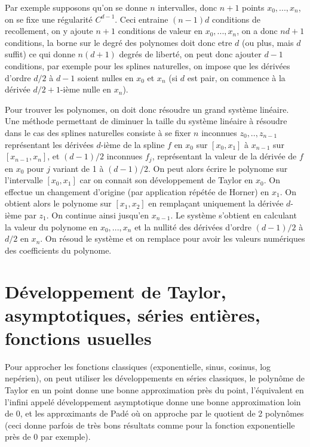 \documentclass[a4paper,11pt]{book}
\begin{document}
\begin{giacjshere}
Par exemple supposons qu'on se donne $n$ intervalles, donc $n+1$
points $x_0,...,x_n$, on se fixe une régularité $C^{d-1}$. Ceci
entraine $(n-1)d$ conditions de recollement, on y ajoute $n+1$
conditions de valeur en $x_0,...,x_n$, on a donc $nd+1$ conditions,
la borne sur le degré des polynomes doit donc etre $d$ (ou plus,
mais $d$ suffit) ce qui donne $n(d+1)$ degrés de liberté, on
peut donc ajouter $d-1$ conditions, par exemple pour les splines
naturelles, on impose que les dérivées d'ordre $d/2$ à $d-1$
soient nulles en $x_0$ et $x_n$ (si $d$ est pair, on commence à
la dérivée $d/2+1$-ième nulle en $x_n$).

Pour trouver les polynomes, on doit donc résoudre un grand système
linéaire. Une méthode permettant de diminuer la taille du système
linéaire à résoudre dans le cas des splines naturelles
consiste à se fixer $n$ inconnues $z_0,..,z_{n-1}$
représentant les dérivées $d$-ième de la spline $f$ en
$x_0$ sur $[x_0,x_1]$ à $x_{n-1}$ sur $[x_{n-1},x_n]$, 
et $(d-1)/2$ inconnues $f_j$, représentant
la valeur de la dérivée de $f$ en $x_0$ pour $j$ variant
de 1 à $(d-1)/2$. On peut alors écrire le polynome sur l'intervalle
$[x_0,x_1]$ car on connait son développement de Taylor en $x_0$.
On effectue un changement d'origine (par application répétée
de Horner) en $x_1$. On obtient alors le polynome sur $[x_1,x_2]$
en remplaçant uniquement la dérivée $d$-ième par $z_1$.
On continue ainsi jusqu'en $x_{n-1}$. Le système s'obtient en
calculant la valeur du polynome en $x_0,...,x_n$ et la nullité
des dérivées d'ordre $(d-1)/2$ à $d/2$ en $x_n$. On résoud
le système et on remplace pour avoir les valeurs numériques
des coefficients du polynome.


\chapter{Développement de Taylor, asymptotiques, 
s\'eries enti\`eres, fonctions usuelles}
\label{sec:series}
Pour approcher les fonctions classiques (exponentielle, sinus,
cosinus, log nepérien), on peut utiliser les développements en séries 
classiques, le polyn\^ome de Taylor en un point donne
une bonne approximation pr\`es du point, l'équivalent
en l'infini appelé développement asymptotique donne
une bonne approximation loin de 0, et
les approximants de Pad\'e 
o\`u on approche par le quotient de 2 polyn\^omes (ceci
donne parfois de tr\`es bons r\'esultats comme pour la fonction
exponentielle pr\`es de 0 par exemple).



\end{giacjshere}
\end{document}
